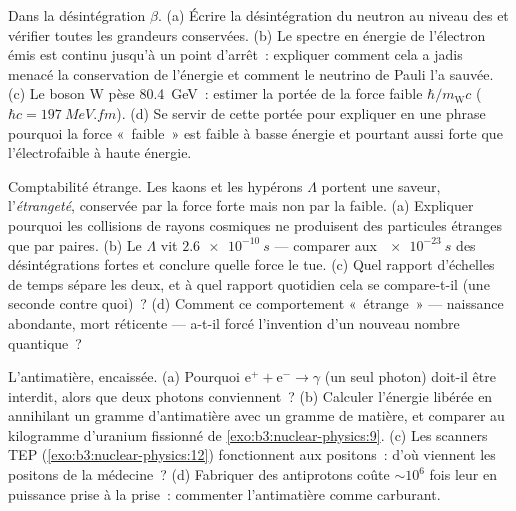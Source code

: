 \begin{exercise}[$\star\star$]\label{exo:b3:particle-physics:6}
Dans la désintégration $\beta$. (a) Écrire la désintégration du
neutron au niveau des  et vérifier toutes les grandeurs
conservées. (b) Le spectre en énergie de l'électron émis est continu
jusqu'à un point d'arrêt~: expliquer comment cela a jadis menacé la
conservation de l'énergie et comment le neutrino de Pauli l'a sauvée.
(c) Le boson W pèse \qty{80.4}{GeV}~: estimer la portée de la force
faible $\hbar/m_{\text{W}}c$ ($\hbar c = \qty{197}{MeV.fm}$). (d)
Se servir de cette portée pour expliquer en une phrase pourquoi la
force «~faible~» est faible à basse énergie et pourtant aussi forte
que l'électrofaible à haute énergie.
\end{exercise}

\begin{exercise}[$\star\star$]\label{exo:b3:particle-physics:7}
Comptabilité étrange. Les kaons et les hypérons $\Lambda$ portent une
saveur, l'\emph{étrangeté}, conservée par la force forte mais non par
la faible. (a) Expliquer pourquoi les collisions de rayons cosmiques
ne produisent des particules étranges que par paires. (b) Le
$\Lambda$ vit $\qty{2.6e-10}{s}$ --- comparer aux $\qty{e-23}{s}$
des désintégrations fortes et conclure quelle force le tue. (c) Quel
rapport d'échelles de temps sépare les deux, et à quel rapport
quotidien cela se compare-t-il (une seconde contre quoi)~? (d)
Comment ce comportement «~étrange~» --- naissance abondante, mort
réticente --- a-t-il forcé l'invention d'un nouveau nombre
quantique~?
\end{exercise}

\begin{exercise}[$\star\star$]\label{exo:b3:particle-physics:8}
L'antimatière, encaissée. (a) Pourquoi
$\text{e}^+ + \text{e}^- \to \gamma$ (un seul photon) doit-il être
interdit, alors que deux photons conviennent~? (b) Calculer l'énergie
libérée en annihilant un gramme d'antimatière avec un gramme de
matière, et comparer au kilogramme d'uranium fissionné de
\cref{exo:b3:nuclear-physics:9}. (c) Les scanners TEP
(\cref{exo:b3:nuclear-physics:12}) fonctionnent aux positons~: d'où
viennent les positons de la médecine~? (d) Fabriquer des antiprotons
coûte $\sim10^{6}$ fois leur  en puissance prise à la
prise~: commenter l'antimatière comme carburant.
\end{exercise}


